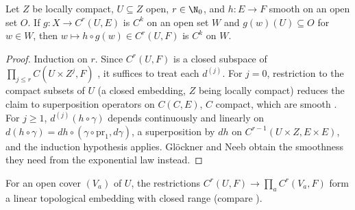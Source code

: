\begin{proposition}
  \label{prop:compLeftOn-smooth}
  \leanok
  Let $Z$ be locally compact, $U \subseteq Z$ open, $r \in \N_0$, and $h \colon E \to F$ smooth on
  an open set $O$. If $g \colon X \to C^r(U, E)$ is $C^k$ on an open set $W$ and
  $g(w)(U) \subseteq O$ for $w \in W$, then $w \mapsto h \circ g(w) \in C^r(U, F)$ is $C^k$ on $W$.
\end{proposition}

\begin{proof}
  \leanok
  Induction on $r$. Since $C^r(U, F)$ is a closed subspace of $\prod_{j \le r} C(U \times Z^j, F)$
  \cite[Lemma~1.7.15]{GN26}, it suffices to treat each $d^{(j)}$. For $j = 0$, restriction to the
  compact subsets of $U$ (a closed embedding, $Z$ being locally compact) reduces the claim to
  superposition operators on $C(C, E)$, $C$ compact, which are smooth
  \cite[Prop.~1.7.1]{GN26}. For $j \ge 1$, $d^{(j)}(h \circ \gamma)$ depends continuously and
  linearly on $d(h \circ \gamma) = dh \circ (\gamma \circ \mathrm{pr}_1, d\gamma)$, a superposition
  by $dh$ on $C^{r-1}(U \times Z, E \times E)$, and the induction hypothesis applies. Glöckner
  and Neeb obtain the smoothness they need from the exponential law
  \cite[Prop.~4.1.34]{GN26} instead.
\end{proof}

\begin{lemma}
  \label{lem:restrict-cover}
  \leanok
  For an open cover $(V_a)$ of $U$, the restrictions $C^r(U, F) \to \prod_a C^r(V_a, F)$ form a
  linear topological embedding with closed range (compare \cite[Lemma~1.7.43, Lemma~4.1.9]{GN26}).
\end{lemma}

